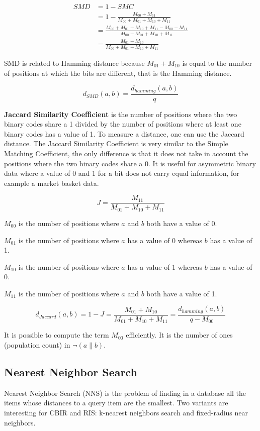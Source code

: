 \[
\begin{split}
SMD & = 1 - SMC \\
    & = 1-\frac{M_{00}+M_{11}}{M_{00}+M_{01}+M_{10}+M_{11}} \\[3ex]
		& = \frac{M_{00}+M_{01}+M_{10}+M_{11}-M_{00}-M_{11}}{M_{00}+M_{01}+M_{10}+M_{11}} \\[3ex]
		& = \frac{M_{01}+M_{10}}{M_{00}+M_{01}+M_{10}+M_{11}}
\end{split}
\]

SMD is related to Hamming distance because $M_{01}+M_{10}$ is equal to the number of positions at which the bits are different, that is the Hamming distance.

\[d_{SMD}(a, b) = \frac{d_{hamming}(a, b)}{q}\]

\textbf{Jaccard Similarity Coefficient} is the number of positions where the two binary codes share a 1 divided by the number of positions where at least one binary codes has a value of 1. To measure a distance, one can use the Jaccard distance. The Jaccard Similarity Coefficient is very similar to the Simple Matching Coefficient, the only difference is that it does not take in account the positions where the two binary codes share a 0. It is useful for asymmetric binary data where a value of 0 and 1 for a bit does not carry equal information, for example a market basket data.

\[J = \frac{M_{11}}{M_{01}+M_{10}+M_{11}}\]

\begin{description}
\item\textbf{$M_{00}$} is the number of positions where $a$ and $b$ both have a value of 0.
\item\textbf{$M_{01}$} is the number of positions where $a$ has a value of 0 whereas $b$ has a value of 1.
\item\textbf{$M_{10}$} is the number of positions where $a$ has a value of 1 whereas $b$ has a value of 0.
\item\textbf{$M_{11}$} is the number of positions where $a$ and $b$ both have a value of 1.
\end{description}

\[d_{Jaccard}(a, b) = 1 - J = \frac{M_{01} + M_{10}}{M_{01}+M_{10}+M_{11}} = \frac{d_{hamming}(a, b)}{q - M_{00}}\]

It is possible to compute the term $M_{00}$ efficiently. It is the number of ones (population count) in $\neg(a \parallel b)$.

\subsection{Nearest Neighbor Search}
Nearest Neighbor Search (NNS) is the problem of finding in a database all the items whose distances to a query item are the smallest. Two variants are interesting for CBIR and RIS: k-nearest neighbors search and fixed-radius near neighbors.

